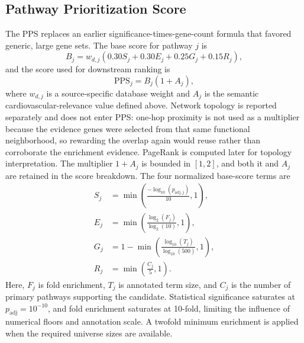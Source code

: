\documentclass{ieeeaccess}
\begin{document}
\subsection{Pathway Prioritization Score}
The PPS replaces an earlier significance-times-gene-count formula that favored generic, large gene sets. The base score for pathway $j$ is
\begin{equation}
 B_j=w_{d,j}\left(0.30S_j+0.30E_j+0.25G_j+0.15R_j\right),
\end{equation}
and the score used for downstream ranking is
\begin{equation}
\mathrm{PPS}_j=B_j(1+A_j),
\label{eq:pps}
\end{equation}
where $w_{d,j}$ is a source-specific database weight and $A_j$ is the semantic cardiovascular-relevance value defined above. Network topology is reported separately and does not enter PPS: one-hop proximity is not used as a multiplier because the evidence genes were selected from that same functional neighborhood, so rewarding the overlap again would reuse rather than corroborate the enrichment evidence. PageRank is computed later for topology interpretation. The multiplier $1+A_j$ is bounded in $[1,2]$, and both it and $A_j$ are retained in the score breakdown. The four normalized base-score terms are
\begin{align}
S_j &= \min\left(\frac{-\log_{10}(p_{\mathrm{adj},j})}{10},1\right),\\
E_j &= \min\left(\frac{\log_2(F_j)}{\log_2(10)},1\right),\\
G_j &= 1-\min\left(\frac{\log_{10}(T_j)}{\log_{10}(500)},1\right),\\
R_j &= \min\left(\frac{C_j}{5},1\right).
\end{align}
Here, $F_j$ is fold enrichment, $T_j$ is annotated term size, and $C_j$ is the number of primary pathways supporting the candidate. Statistical significance saturates at $p_{\mathrm{adj}}=10^{-10}$, and fold enrichment saturates at 10-fold, limiting the influence of numerical floors and annotation scale. A twofold minimum enrichment is applied when the required universe sizes are available.
\end{document}
